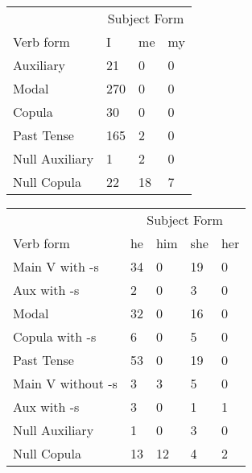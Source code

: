 \begin{table}[]
    \begin{minipage}{0.5\textwidth}
    \centering
    \begin{tabular}{@{}llll@{}}
        \toprule
            &\multicolumn{3}{c}{Subject Form}\\
            \cline{2-4}
        Verb form & I & me & my \\
        \midrule
        Auxiliary & 21 & 0 & 0 \\
        Modal & 270 & 0 & 0 \\
        Copula & 30 & 0 & 0 \\
        Past Tense & 165 & 2 & 0 \\
        \hline
        Null Auxiliary & 1 & 2 & 0 \\
        Null Copula & 22 & 18 & 7 \\
        \bottomrule
    \end{tabular}
\end{minipage}
\begin{minipage}{0.5\textwidth}
    \centering
    \begin{tabular}{@{}lllll@{}}
        \toprule
            &\multicolumn{4}{c}{Subject Form}\\
            \cline{2-5}
        Verb form & he & him & she & her \\
        \midrule
        Main V with -s & 34 & 0 & 19 & 0 \\
        Aux with -s & 2 & 0 & 3 & 0 \\
        Modal & 32 & 0 & 16 & 0 \\
        Copula with -s & 6 & 0 & 5 & 0 \\
        Past Tense & 53 & 0 & 19 & 0 \\
        \hline
        Main V without -s & 3 & 3 & 5 & 0 \\
        Aux with -s & 3 & 0 & 1 & 1 \\
        Null Auxiliary & 1 & 0 & 3 & 0 \\
        Null Copula & 13 & 12 & 4 & 2 \\
        \bottomrule
    \end{tabular}
\end{minipage}
\end{table}
